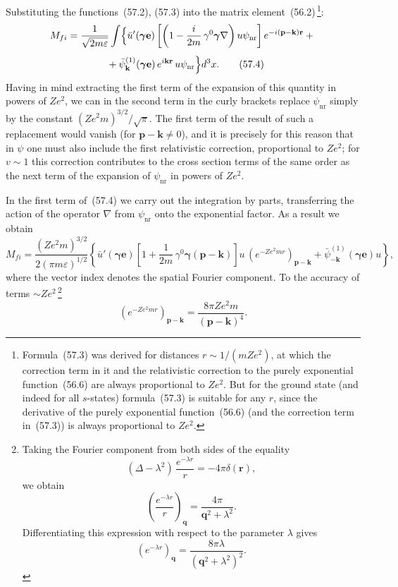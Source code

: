 Substituting the functions~(57.2), (57.3) into the matrix element~(56.2)\,\footnote{Formula~(57.3) was derived for distances $r \sim 1/(mZe^2)$, at which the correction term in it and the relativistic correction to the purely exponential function~(56.6) are always proportional to $Ze^2$. But for the ground state (and indeed for all $s$-states) formula~(57.3) is suitable for any $r$, since the derivative of the purely exponential function~(56.6) (and the correction term in~(57.3)) is always proportional to $Ze^2$.}:
\begin{align}
M_{fi} &= \frac{1}{\sqrt{2m\varepsilon}}\int\Bigl\{\bar{u}'(\boldsymbol{\gamma}\mathbf{e})\left[\left(1 - \frac{i}{2m}\,\gamma^0\boldsymbol{\gamma}\nabla\right)u\psi_\mathrm{nr}\right]e^{-i(\mathbf{p}-\mathbf{k})\mathbf{r}} +{}\notag\\[4pt]
&\qquad\qquad{} + \bar{\psi}^{(1)}_\mathbf{k}(\boldsymbol{\gamma}\mathbf{e})\,e^{i\mathbf{k}\mathbf{r}}\,u\psi_\mathrm{nr}\Bigr\}d^3x.
\tag{57.4}
\end{align}
Having in mind extracting the first term of the expansion of this quantity in powers of $Ze^2$, we can in the second term in the curly brackets replace $\psi_\mathrm{nr}$ simply by the constant $(Ze^2m)^{3/2}/\sqrt{\pi}$. The first term of the result of such a replacement would vanish (for $\mathbf{p} - \mathbf{k} \neq 0$), and it is precisely for this reason that in $\psi$ one must also include the first relativistic correction, proportional to $Ze^2$; for $v \sim 1$ this correction contributes to the cross section terms of the same order as the next term of the expansion of $\psi_\mathrm{nr}$ in powers of $Ze^2$.

In the first term of~(57.4) we carry out the integration by parts, transferring the action of the operator $\nabla$ from $\psi_\mathrm{nr}$ onto the exponential factor. As a result we obtain
\begin{equation}
M_{fi} = \frac{(Ze^2m)^{3/2}}{2(\pi m\varepsilon)^{1/2}}\left\{\bar{u}'(\boldsymbol{\gamma}\mathbf{e})\left[1 + \frac{1}{2m}\,\gamma^0\boldsymbol{\gamma}(\mathbf{p}-\mathbf{k})\right]u\,(e^{-Ze^2mr})_{\mathbf{p}-\mathbf{k}} + \bar{\psi}^{(1)}_{-\mathbf{k}}(\boldsymbol{\gamma}\mathbf{e})u\right\},
\tag{57.5}
\end{equation}
where the vector index denotes the spatial Fourier component. To the accuracy of terms $\sim Ze^2$\,\footnote{Taking the Fourier component from both sides of the equality
\[
(\Delta - \lambda^2)\,\frac{e^{-\lambda r}}{r} = -4\pi\delta(\mathbf{r}),
\]
we obtain
\begin{equation}
\left(\frac{e^{-\lambda r}}{r}\right)_\mathbf{q} = \frac{4\pi}{\mathbf{q}^2 + \lambda^2}.
\tag{57.6a}
\end{equation}
Differentiating this expression with respect to the parameter $\lambda$ gives
\begin{equation}
(e^{-\lambda r})_\mathbf{q} = \frac{8\pi\lambda}{(\mathbf{q}^2 + \lambda^2)^2}.
\tag{57.6b}
\end{equation}}
\begin{equation}
(e^{-Ze^2mr})_{\mathbf{p}-\mathbf{k}} = \frac{8\pi Ze^2m}{(\mathbf{p}-\mathbf{k})^4}.
\tag{57.6}
\end{equation}

